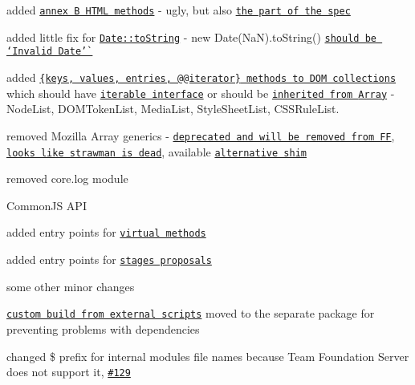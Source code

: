 \begin{DoxyItemize}
\item added \href{https://github.com/zloirock/core-js#ecmascript-6-string}{\tt annex B H\+T\+ML methods} -\/ ugly, but also \href{http://www.ecma-international.org/ecma-262/6.0/#sec-string.prototype.anchor}{\tt the part of the spec}
\item added little fix for \href{https://github.com/zloirock/core-js#ecmascript-6-date}{\tt {\ttfamily Date\+::to\+String}} -\/ {\ttfamily new Date(\+Na\+N).to\+String()} \href{http://www.ecma-international.org/ecma-262/6.0/#sec-todatestring}{\tt should be `\textquotesingle{}Invalid Date'\`{}}
\item added \href{https://github.com/zloirock/core-js#iterable-dom-collections}{\tt {\ttfamily \{keys, values, entries, @@iterator\}} methods to D\+OM collections} which should have \href{https://heycam.github.io/webidl/#idl-iterable}{\tt iterable interface} or should be \href{https://heycam.github.io/webidl/#LegacyArrayClass}{\tt inherited from {\ttfamily Array}} -\/ {\ttfamily Node\+List}, {\ttfamily D\+O\+M\+Token\+List}, {\ttfamily Media\+List}, {\ttfamily Style\+Sheet\+List}, {\ttfamily C\+S\+S\+Rule\+List}.
\item removed Mozilla {\ttfamily Array} generics -\/ \href{https://developer.mozilla.org/en-US/docs/Web/JavaScript/Reference/Global_Objects/Array#Array_generic_methods}{\tt deprecated and will be removed from FF}, \href{http://wiki.ecmascript.org/doku.php?id=strawman:array_statics}{\tt looks like strawman is dead}, available \href{https://github.com/plusdude/array-generics}{\tt alternative shim}
\item removed {\ttfamily core.\+log} module
\item Common\+JS A\+PI
\begin{DoxyItemize}
\item added entry points for \href{https://github.com/zloirock/core-js#commonjs-and-prototype-methods-without-global-namespace-pollution}{\tt virtual methods}
\item added entry points for \href{https://github.com/zloirock/core-js#ecmascript-7-proposals}{\tt stages proposals}
\item some other minor changes
\end{DoxyItemize}
\item \href{https://github.com/zloirock/core-js#custom-build-from-external-scripts}{\tt custom build from external scripts} moved to the separate package for preventing problems with dependencies
\item changed {\ttfamily \$} prefix for internal modules file names because Team Foundation Server does not support it, \href{https://github.com/zloirock/core-js/issues/129}{\tt \#129}

\end{DoxyItemize}
